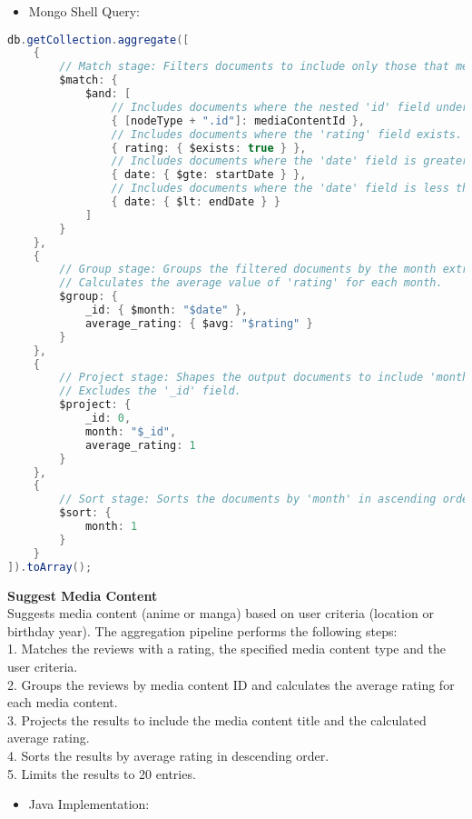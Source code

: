 \begin{itemize}
    \item Mongo Shell Query:
\end{itemize}

\begin{mdframed}[style=customstyle]
\begin{lstlisting}[language=java]
db.getCollection.aggregate([
    { 
        // Match stage: Filters documents to include only those that meet the specified conditions.
        $match: { 
            $and: [
                // Includes documents where the nested 'id' field under 'nodeType' matches 'mediaContentId'.
                { [nodeType + ".id"]: mediaContentId },
                // Includes documents where the 'rating' field exists.
                { rating: { $exists: true } },
                // Includes documents where the 'date' field is greater than or equal to 'startDate'.
                { date: { $gte: startDate } },
                // Includes documents where the 'date' field is less than 'endDate'.
                { date: { $lt: endDate } }
            ]
        } 
    },
    { 
        // Group stage: Groups the filtered documents by the month extracted from the 'date' field.
        // Calculates the average value of 'rating' for each month.
        $group: { 
            _id: { $month: "$date" },
            average_rating: { $avg: "$rating" }
        } 
    },
    { 
        // Project stage: Shapes the output documents to include 'month' and 'average_rating' fields.
        // Excludes the '_id' field.
        $project: { 
            _id: 0,
            month: "$_id",
            average_rating: 1
        } 
    },
    { 
        // Sort stage: Sorts the documents by 'month' in ascending order.
        $sort: { 
            month: 1 
        } 
    }
]).toArray();\end{lstlisting}
\end{mdframed}

\textbf{Suggest Media Content}\\
Suggests media content (anime or manga) based on user criteria (location or birthday year).
The aggregation pipeline performs the following steps:\\
1. Matches the reviews with a rating, the specified media content type and the user criteria.\\
2. Groups the reviews by media content ID and calculates the average rating for each media content.\\
3. Projects the results to include the media content title and the calculated average rating.\\
4. Sorts the results by average rating in descending order.\\
5. Limits the results to 20 entries.
\begin{itemize}
    \item Java Implementation:
\end{itemize}

